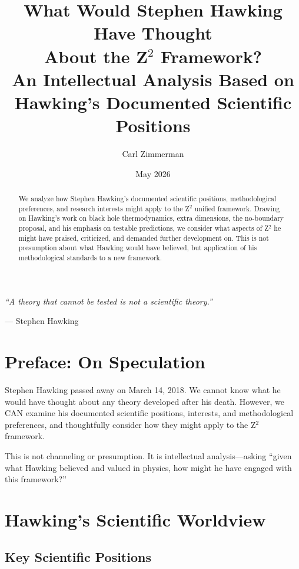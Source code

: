 \documentclass[12pt,a4paper]{article}
\title{\textbf{What Would Stephen Hawking Have Thought\\About the Z$^2$ Framework?}\\[0.5em]
\large An Intellectual Analysis Based on Hawking's Documented Scientific Positions}
\author{Carl Zimmerman}
\date{May 2026}
\begin{document}
\maketitle

\begin{abstract}
We analyze how Stephen Hawking's documented scientific positions, methodological preferences, and research interests might apply to the Z$^2$ unified framework. Drawing on Hawking's work on black hole thermodynamics, extra dimensions, the no-boundary proposal, and his emphasis on testable predictions, we consider what aspects of Z$^2$ he might have praised, criticized, and demanded further development on. This is not presumption about what Hawking would have believed, but application of his methodological standards to a new framework.
\end{abstract}

\vspace{0.5cm}
\epigraph{\textit{``A theory that cannot be tested is not a scientific theory.''}}{--- Stephen Hawking}
\vspace{0.5cm}

\tableofcontents
\newpage

\section{Preface: On Speculation}

Stephen Hawking passed away on March 14, 2018. We cannot know what he would have thought about any theory developed after his death. However, we CAN examine his documented scientific positions, interests, and methodological preferences, and thoughtfully consider how they might apply to the Z$^2$ framework.

This is not channeling or presumption. It is intellectual analysis---asking ``given what Hawking believed and valued in physics, how might he have engaged with this framework?''

\section{Hawking's Scientific Worldview}

\subsection{Key Scientific Positions}
\end{document}
